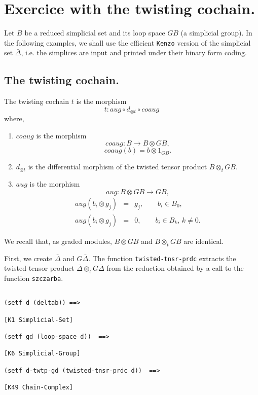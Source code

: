 \newpage

\section{Exercice with the twisting cochain.}

Let $B$ be a reduced simplicial set and its loop space $GB$ (a simplicial group).
In the following examples, we shall use the efficient {\tt Kenzo}
version of the simplicial set $\bar{\Delta}$, i.e. the simplices are input
and printed under their binary form coding.

\subsection {The twisting cochain.}

The twisting cochain $t$ is the morphism
$$t: aug \circ d_{\otimes t} \circ coaug$$
where,
\begin{enumerate}
\item $coaug$ is the morphism 
$$ coaug: B \rightarrow B \otimes GB,$$
$$ coaug(b) = b \otimes 1_{GB}. $$
\item $d_{\otimes t}$ is the differential morphism of the twisted tensor product
$B \otimes_t GB$.
\item $aug$ is the morphism
$$aug: B \otimes GB  \longrightarrow GB ,  $$
\begin{eqnarray*}
aug(b_i \otimes g_j)&  = & g_j, \qquad b_i \in B_0, \\
aug(b_i \otimes g_j)&  = & 0, \qquad b_i \in B_k,\, k\not=0.
\end{eqnarray*}
\end{enumerate}
We recall that, as graded modules, $B\otimes GB$ and $B \otimes_t GB$ are
identical.
\par
First, we create $\bar{\Delta}$ and $G\bar{\Delta}$. The function {\tt twisted-tnsr-prdc}
extracts the twisted tensor product $\bar{\Delta} \otimes_t G\bar{\Delta}$ from
the reduction obtained by a call to the function {\tt szczarba}.
{\footnotesize\begin{verbatim}

(setf d (deltab)) ==>

[K1 Simplicial-Set]

(setf gd (loop-space d))  ==>

[K6 Simplicial-Group]

(setf d-twtp-gd (twisted-tnsr-prdc d))  ==>

[K49 Chain-Complex]
\end{verbatim}}
